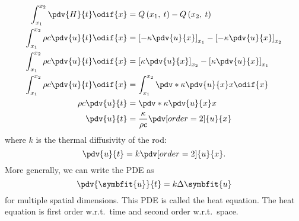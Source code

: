 \documentclass{article}
\begin{document}
\begin{align*}
    \int_{x_1}^{x_2} \pdv{H}{t} \odif{x}        & = Q\left( x_1,\: t \right) - Q\left( x_2,\: t \right)                               \\
    \int_{x_1}^{x_2} \rho c \pdv{u}{t} \odif{x} & = \left[ -\kappa \pdv{u}{x} \right]_{x_1} - \left[ -\kappa \pdv{u}{x} \right]_{x_2} \\
    \int_{x_1}^{x_2} \rho c \pdv{u}{t} \odif{x} & = \left[ \kappa \pdv{u}{x} \right]_{x_2} - \left[ \kappa \pdv{u}{x} \right]_{x_1}   \\
    \int_{x_1}^{x_2} \rho c \pdv{u}{t} \odif{x} & = \int_{x_1}^{x_2} \pdv*{\kappa \pdv{u}{x}}{x} \odif{x}                             \\
    \rho c \pdv{u}{t}                           & = \pdv*{\kappa \pdv{u}{x}}{x}                                                       \\
    \pdv{u}{t}                                  & = \frac{\kappa}{\rho c} \pdv[order=2]{u}{x}
\end{align*}
where \(k\) is the thermal diffusivity of the rod:
\begin{equation*}
    \pdv{u}{t} = k\pdv[order=2]{u}{x}.
\end{equation*}
More generally, we can write the PDE as
\begin{equation*}
    \pdv{\symbfit{u}}{t} = k \Delta{\symbfit{u}}
\end{equation*}
for multiple spatial dimensions. This PDE is called the heat equation.
The heat equation is first order w.r.t.\ time and second order w.r.t.\ space.
\end{document}
